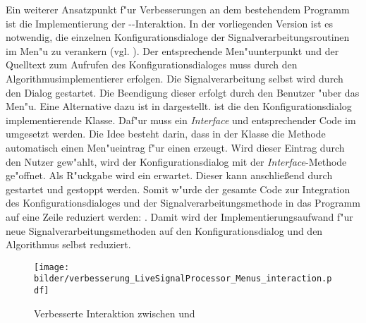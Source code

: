 Ein weiterer Ansatzpunkt f"ur Verbesserungen an dem bestehendem Programm ist die Implementierung der --Interaktion.
In der vorliegenden Version ist es notwendig, die einzelnen Konfigurationsdialoge der Signalverarbeitungsroutinen im Men"u zu verankern (vgl. ).
Der entsprechende Men"uunterpunkt und der Quelltext zum Aufrufen des Konfigurationsdialoges muss durch den Algorithmusimplementierer erfolgen.
Die Signalverarbeitung selbst wird durch den Dialog gestartet.
Die Beendigung dieser erfolgt durch den Benutzer "uber das Men"u.
Eine Alternative dazu ist in  dargestellt.
 ist die den Konfigurationsdialog implementierende Klasse.
Daf"ur muss ein \emph{Interface}  und entsprechender Code im  umgesetzt werden.
Die Idee besteht darin, dass in der Klasse  die Methode  automatisch einen Men"ueintrag f"ur einen  erzeugt.
Wird dieser Eintrag durch den Nutzer gew"ahlt, wird der Konfigurationsdialog mit der \emph{Interface}-Methode  ge"offnet.
Als R"uckgabe wird ein  erwartet.
Dieser kann anschlie{\ss}end durch  gestartet und gestoppt werden.
Somit w"urde der gesamte Code zur Integration des Konfigurationsdialoges und der Signalverarbeitungsmethode in das Programm auf eine Zeile reduziert werden:
.
Damit wird der Implementierungsaufwand f"ur neue Signalverarbeitungsmethoden auf den Konfigurationsdialog und den Algorithmus selbst reduziert.

\begin{figure}[htb]
\centering
\texttt{[image: bilder/verbesserung\_LiveSignalProcessor\_Menus\_interaction.pdf]}
\caption{Verbesserte Interaktion zwischen  und }
\label{pic:better_detail_signalprocessing}
\end{figure}

